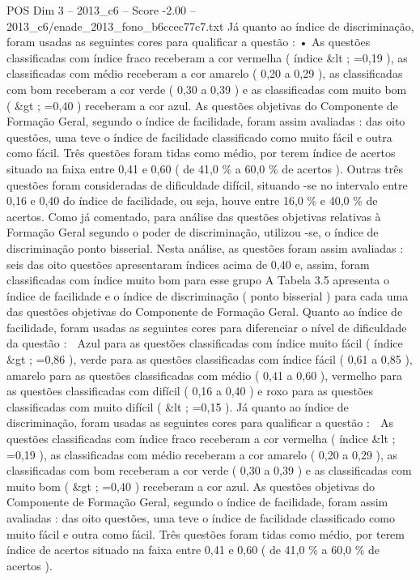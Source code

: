 \begin{textsample}{POS Dim 3 – 2013\_c6 – Score -2.00 – 2013\_c6/enade\_2013\_fono\_b6ccec77c7.txt}
Já quanto ao índice de discriminação, foram usadas as seguintes cores para qualificar a questão : • As questões classificadas com índice fraco receberam a cor vermelha ( índice \&lt ; =0,19 ), as classificadas com médio receberam a cor amarelo ( 0,20 a 0,29 ), as classificadas com bom receberam a cor verde ( 0,30 a 0,39 ) e as classificadas com muito bom ( \&gt ; =0,40 ) receberam a cor azul.
As questões objetivas do Componente de Formação Geral, segundo o índice de facilidade, foram assim avaliadas : das oito questões, uma teve o índice de facilidade classificado como muito fácil e outra como fácil.
Três questões foram tidas como médio, por terem índice de acertos situado na faixa entre 0,41 e 0,60 ( de 41,0 \% a 60,0 \% de acertos ).
Outras três questões foram consideradas de dificuldade difícil, situando -se no intervalo entre 0,16 e 0,40 do índice de facilidade, ou seja, houve entre 16,0 \% e 40,0 \% de acertos.
Como já comentado, para análise das questões objetivas relativas à Formação Geral segundo o poder de discriminação, utilizou -se, o índice de discriminação ponto bisserial.
Nesta análise, as questões foram assim avaliadas : seis das oito questões apresentaram índices acima de 0,40 e, assim, foram classificadas com índice muito bom para esse grupo A Tabela 3.5 apresenta o índice de facilidade e o índice de discriminação ( ponto bisserial ) para cada uma das questões objetivas do Componente de Formação Geral.
Quanto ao índice de facilidade, foram usadas as seguintes cores para diferenciar o nível de dificuldade da questão :  Azul para as questões classificadas com índice muito fácil ( índice \&gt ; =0,86 ), verde para as questões classificadas com índice fácil ( 0,61 a 0,85 ), amarelo para as questões classificadas com médio ( 0,41 a 0,60 ), vermelho para as questões classificadas com difícil ( 0,16 a 0,40 ) e roxo para as questões classificadas com muito difícil ( \&lt ; =0,15 ).
Já quanto ao índice de discriminação, foram usadas as seguintes cores para qualificar a questão :  As questões classificadas com índice fraco receberam a cor vermelha ( índice \&lt ; =0,19 ), as classificadas com médio receberam a cor amarelo ( 0,20 a 0,29 ), as classificadas com bom receberam a cor verde ( 0,30 a 0,39 ) e as classificadas com muito bom ( \&gt ; =0,40 ) receberam a cor azul.
As questões objetivas do Componente de Formação Geral, segundo o índice de facilidade, foram assim avaliadas : das oito questões, uma teve o índice de facilidade classificado como muito fácil e outra como fácil.
Três questões foram tidas como médio, por terem índice de acertos situado na faixa entre 0,41 e 0,60 ( de 41,0 \% a 60,0 \% de acertos ).

\end{textsample}
